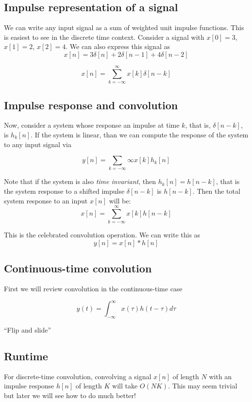 \subsection{Impulse representation of a signal}
We can write any input signal as a sum of weighted unit impulse
functions. This is easiest to see in the discrete time context. 
Consider a signal with $x[0]=3$, $x[1]=2$, $x[2] = 4$. We can also 
express this signal as 
\[
x[n] = 3\delta[n] + 2\delta[n-1] + 4\delta[n-2]
\]  

\[
x[n] = \sum_{k=-\infty}^\infty x[k]\delta[n-k]
\]

\subsection{Impulse response and convolution}
Now, consider a system whose response an impulse at time $k$, 
that is, $\delta[n-k]$, is $h_k[n]$. If the system is linear,
than we can compute the response of the system to any input signal
via

\[
y[n] = \sum_{k=-\infty}{\infty} x[k] h_k[n]
\]

Note that if the system is also \textit{time invariant}, then
$h_k[n] = h[n -k]$, that is the system response to a shifted
impulse $\delta[n-k]$ is $h[n-k]$. Then the total system
response to an input $x[n]$ will be: 
\[
x[n] = \sum_{k=-\infty}^\infty x[k] h[n-k]
\]

This is the celebrated convolution operation. We can 
write this as
\[
y[n] = x[n] * h[n]
\]


\subsection{Continuous-time convolution}

First we will review convolution in the continuous-time
case

\[
y(t) = \int_{-\infty}^{\infty} x(\tau) h(t - \tau) d\tau
\]


``Flip and slide'' 

\subsection{Runtime}

For discrete-time convolution, convolving a
signal $x[n]$ of length $N$ with an impulse response
$h[n]$ of length $K$ will take $O(NK)$. This 
may seem trivial but later we will see how to do 
much better! 


